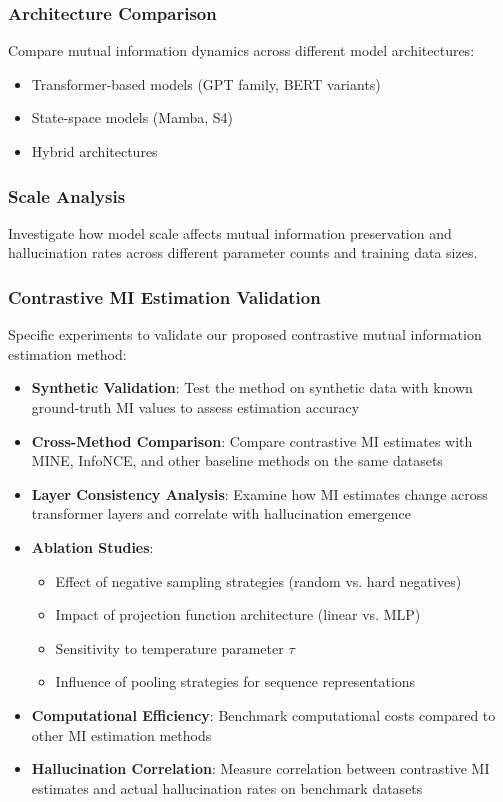 \subsubsection{Architecture Comparison}
Compare mutual information dynamics across different model architectures:
\begin{itemize}
    \item Transformer-based models (GPT family, BERT variants)
    \item State-space models (Mamba, S4)
    \item Hybrid architectures
\end{itemize}

\subsubsection{Scale Analysis}
Investigate how model scale affects mutual information preservation and hallucination rates across different parameter counts and training data sizes.

\subsubsection{Contrastive MI Estimation Validation}
Specific experiments to validate our proposed contrastive mutual information estimation method:

\begin{itemize}
    \item \textbf{Synthetic Validation}: Test the method on synthetic data with known ground-truth MI values to assess estimation accuracy
    \item \textbf{Cross-Method Comparison}: Compare contrastive MI estimates with MINE, InfoNCE, and other baseline methods on the same datasets
    \item \textbf{Layer Consistency Analysis}: Examine how MI estimates change across transformer layers and correlate with hallucination emergence
    \item \textbf{Ablation Studies}:
    \begin{itemize}
        \item Effect of negative sampling strategies (random vs. hard negatives)
        \item Impact of projection function architecture (linear vs. MLP)
        \item Sensitivity to temperature parameter $\tau$
        \item Influence of pooling strategies for sequence representations
    \end{itemize}
    \item \textbf{Computational Efficiency}: Benchmark computational costs compared to other MI estimation methods
    \item \textbf{Hallucination Correlation}: Measure correlation between contrastive MI estimates and actual hallucination rates on benchmark datasets
\end{itemize}

